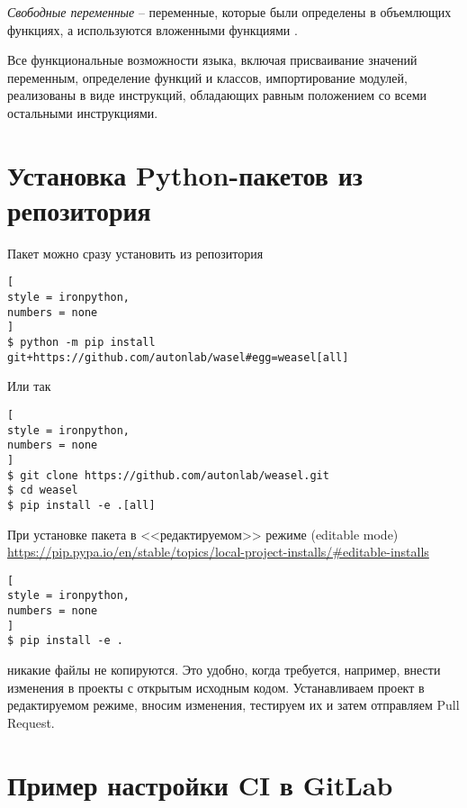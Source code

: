 \documentclass[%
	11pt,
	a4paper,
	utf8,
		]{article}
\begin{document}
\emph{Свободные переменные} -- переменные, которые были определены в объемлющих функциях, а используются вложенными функциями \cite[]{beazley:python-2010}.

Все функциональные возможности языка, включая присваивание значений переменным, определение функций и классов, импортирование модулей, реализованы в виде инструкций, обладающих равным положением со всеми остальными инструкциями.

\section{Установка Python-пакетов из репозитория}

Пакет можно сразу установить из репозитория
\begin{lstlisting}[
style = ironpython,
numbers = none
]
$ python -m pip install git+https://github.com/autonlab/wasel#egg=weasel[all]
\end{lstlisting}

Или так
\begin{lstlisting}[
style = ironpython,
numbers = none
]
$ git clone https://github.com/autonlab/weasel.git
$ cd weasel
$ pip install -e .[all]
\end{lstlisting}

При установке пакета в <<редактируемом>> режиме (editable mode) \url{https://pip.pypa.io/en/stable/topics/local-project-installs/#editable-installs}
\begin{lstlisting}[
style = ironpython,
numbers = none
]
$ pip install -e .
\end{lstlisting}
никакие файлы не копируются. Это удобно, когда требуется, например, внести изменения в проекты с открытым исходным кодом. Устанавливаем проект в редактируемом режиме, вносим изменения, тестируем их и затем отправляем Pull Request. 

\section{Пример настройки CI в GitLab}
\end{document}
